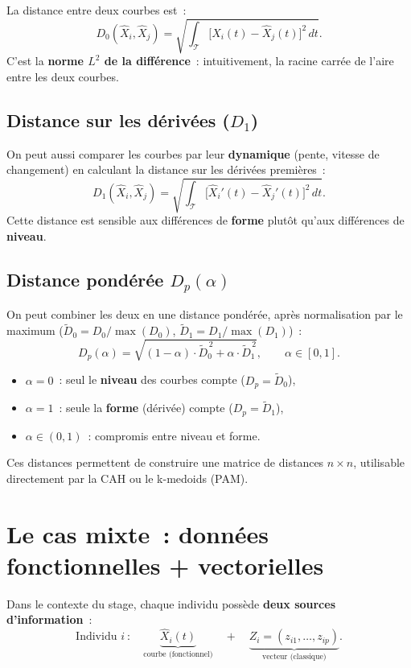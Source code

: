 \documentclass[11pt, a4paper]{article}
\begin{document}
La distance entre deux courbes est~:
\[
    D_0(\hat{X}_i, \hat{X}_j) = \sqrt{\int_{\mathcal{T}} \bigl[\hat{X}_i(t) - \hat{X}_j(t)\bigr]^2 \, dt}.
\]
C'est la \textbf{norme $L^2$ de la diff\'erence}~: intuitivement, la racine carr\'ee de l'aire entre les deux courbes.

\subsection{Distance sur les d\'eriv\'ees ($D_1$)}

On peut aussi comparer les courbes par leur \textbf{dynamique} (pente, vitesse de changement) en calculant la distance sur les d\'eriv\'ees premi\`eres~:
\[
    D_1(\hat{X}_i, \hat{X}_j) = \sqrt{\int_{\mathcal{T}} \bigl[\hat{X}_i'(t) - \hat{X}_j'(t)\bigr]^2 \, dt}.
\]
Cette distance est sensible aux diff\'erences de \textbf{forme} plut\^ot qu'aux diff\'erences de \textbf{niveau}.

\subsection{Distance pond\'er\'ee $D_p(\alpha)$}

On peut combiner les deux en une distance pond\'er\'ee, apr\`es normalisation par le maximum ($\tilde{D}_0 = D_0 / \max(D_0)$, $\tilde{D}_1 = D_1 / \max(D_1)$)~:
\[
    D_p(\alpha) = \sqrt{(1 - \alpha) \cdot \tilde{D}_0^{\,2} + \alpha \cdot \tilde{D}_1^{\,2}}, \qquad \alpha \in [0, 1].
\]
\begin{itemize}[nosep]
    \item $\alpha = 0$~: seul le \textbf{niveau} des courbes compte ($D_p = \tilde{D}_0$),
    \item $\alpha = 1$~: seule la \textbf{forme} (d\'eriv\'ee) compte ($D_p = \tilde{D}_1$),
    \item $\alpha \in (0,1)$~: compromis entre niveau et forme.
\end{itemize}

Ces distances permettent de construire une matrice de distances $n \times n$, utilisable directement par la CAH ou le k-medoids (PAM).

\section{Le cas mixte~: donn\'ees fonctionnelles + vectorielles}

Dans le contexte du stage, chaque individu poss\`ede \textbf{deux sources d'information}~:
\[
    \text{Individu } i~: \quad \underbrace{\hat{X}_i(t)}_{\text{courbe (fonctionnel)}} \quad + \quad \underbrace{Z_i = (z_{i1}, \ldots, z_{ip})}_{\text{vecteur (classique)}}.
\]
\end{document}
